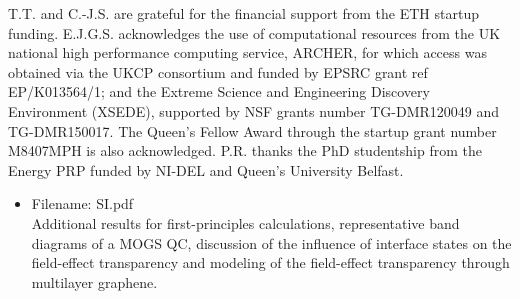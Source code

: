 \documentclass[journal=nalefd]{achemso}
\newcommand*\change[1]{{#1}}
\begin{document}
\begin{acknowledgement}
T.T. and C.-J.S. are grateful for the financial support from the ETH startup funding.
E.J.G.S. acknowledges the use of computational resources 
from the UK national high performance computing service, ARCHER, 
for which access was obtained via the UKCP consortium and funded by 
EPSRC grant ref EP/K013564/1; and the Extreme Science and Engineering Discovery 
Environment (XSEDE), supported by NSF grants number TG-DMR120049 and TG-DMR150017. 
The Queen's Fellow Award through the startup grant number M8407MPH is also acknowledged.
P.R. thanks the PhD studentship from the 
Energy PRP funded by NI-DEL and Queen's University Belfast. 
\end{acknowledgement}

\begin{suppinfo}

\begin{itemize}
  \item Filename: SI.pdf\\
        Additional results for first-principles calculations, representative band diagrams of a MOGS QC,
        \change{discussion of the influence of interface states on the field-effect transparency
        and modeling of the field-effect transparency through multilayer graphene.}
\end{itemize}

\end{suppinfo}

% 

\end{document}

